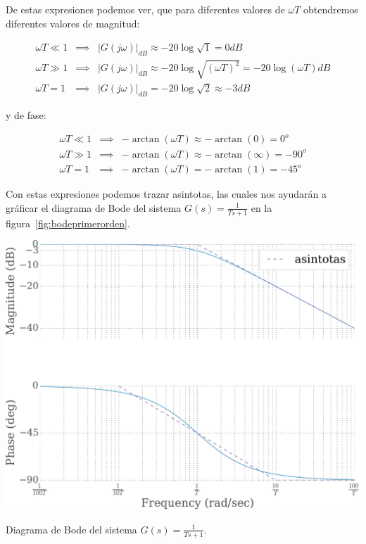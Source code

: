         De estas expresiones podemos ver, que para diferentes valores de $\omega T$ obtendremos diferentes valores de magnitud:

        \begin{eqnarray*}
            \omega T \ll 1 & \implies & \left| G(j \omega) \right|_{dB} \approx -20 \log{\sqrt{1}} = 0 dB \\
            \omega T \gg 1 & \implies & \left| G(j \omega) \right|_{dB} \approx -20 \log{\sqrt{(\omega T)^2}} = -20 \log{(\omega T)} dB \\
            \omega T = 1 & \implies & \left| G(j \omega) \right|_{dB} = -20 \log{\sqrt{2}} \approx -3 dB
        \end{eqnarray*}

        y de fase:

        \begin{eqnarray*}
            \omega T \ll 1 & \implies & -\arctan{(\omega T)} \approx - \arctan{(0)} = 0^o \\
            \omega T \gg 1 & \implies & -\arctan{(\omega T)} \approx - \arctan{(\infty)} = -90^o \\
            \omega T = 1 & \implies & -\arctan{(\omega T)} = - \arctan{(1)} = -45^o
        \end{eqnarray*}

        Con estas expresiones podemos trazar asintotas,  las cuales nos ayudarán a gráficar el diagrama de Bode del sistema $G(s) = \frac{1}{Ts + 1}$ en la figura~\ref{fig:bodeprimerorden}.

        \begin{marginfigure}
            \centering
            \includegraphics[width=\textwidth]{./imagenes/bodeprimerorden.pdf}
            \caption{\label{fig:bodeprimerorden}Diagrama de Bode del sistema $G(s) = \frac{1}{Ts + 1}$.}
        \end{marginfigure}


